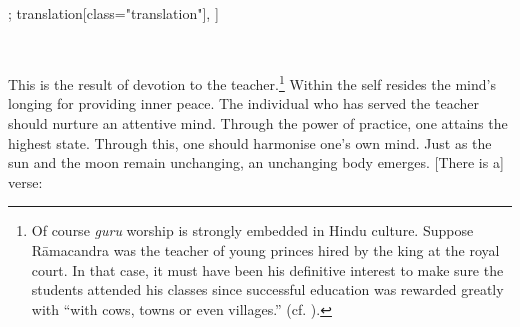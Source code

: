 \begin{alignment}[
  texts=edition[class="edition"];
  translation[class="translation"],
  ]
\begin{edition}
\begin{tlg}[44_1]
\\
\end{tlg}
  \end{edition}
  \begin{translation}
                   \begin{tlate}[p43_01]
\noindent
This is the result of devotion to the teacher.\footnote{Of course \textit{guru} worship is strongly embedded in Hindu culture. Suppose Rāmacandra was the teacher of young princes hired by the king at the royal court. In that case, it must have been his definitive interest to make sure the students attended his classes since successful education was rewarded greatly with ``with cows, towns or even villages.'' (cf. \citeauthor[1939:20]{manasollasa}).} Within the self resides the mind's longing for providing inner peace. The individual who has served the teacher should nurture an attentive mind. Through the power of practice, one attains the highest state. Through this, one should harmonise one's own mind. Just as the sun and the moon remain unchanging, an unchanging body emerges. [There is a] verse:
\end{tlate}
\begin{tlate}[43_1]

\end{tlate}
\end{translation}
\end{alignment}
